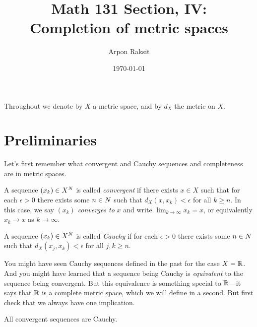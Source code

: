 


\title{Math 131 Section, IV:\\Completion of metric spaces}
\author{Arpon Raksit}
\date{\today}


\maketitle
\thispagestyle{fancy}


\begin{notation}
  Throughout we denote by $X$ a metric space, and by $d_X$ the metric
  on $X$.
\end{notation}

\section{Preliminaries}

Let's first remember what convergent and Cauchy sequences and
completeness are in metric spaces.

\begin{definition}
  A sequence $(x_k) \in X^N$ is called \textit{convergent} if there
  exists $x \in X$ such that for each $\epsilon > 0$ there exists some
  $n \in N$ such that $d_X(x,x_k) < \epsilon$ for all $k \ge n$. In
  this case, we say $(x_k)$ \textit{converges to} $x$ and write
  $\lim_{k \to \infty} x_k = x$, or equivalently $x_k \to x$ as $k \to
  \infty$.
\end{definition}

\begin{definition}
  A sequence $(x_k) \in X^N$ is called \textit{Cauchy} if for each
  $\epsilon > 0$ there exists some $n \in N$ such that $d_X(x_j,x_k)
  < \epsilon$ for all $j,k \ge n$.
\end{definition}

You might have seen Cauchy sequences defined in the past for the case
$X = \mathbb{R}$. And you might have learned that a sequence being Cauchy is
\textit{equivalent} to the sequence being convergent. But this
equivalence is something special to $\mathbb{R}$---it says that $\mathbb{R}$ is a
complete metric space, which we will define in a second. But first
check that we always have one implication.

\begin{exercise}
  \label{convergentcauchy}
  All convergent sequences are Cauchy.
\end{exercise}

